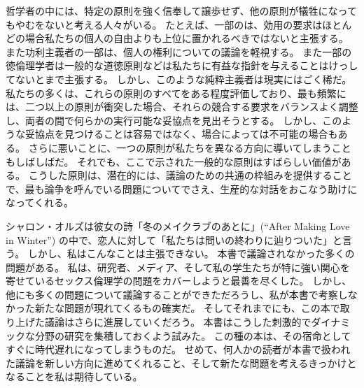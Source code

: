 \documentclass[paper=a4,book,openany]{jlreq}
\begin{document}
\vspace{1\zw}

哲学者の中には、特定の原則を強く信奉して譲歩せず、他の原則が犠牲になってもやむをないと考える人々がいる。
たとえば、一部のは、効用の要求はほとんどの場合私たちの個人の自由よりも上位に置かれるべきではないと主張する。
また功利主義者の一部は、個人の権利についての議論を軽視する。
また一部の徳倫理学者は一般的な道徳原則などは私たちに有益な指針を与えることはけっしてないとまで主張する。
しかし、このような純粋主義者は現実にはごく稀だ。
私たちの多くは、これらの原則のすべてをある程度評価しており、最も頻繁には、二つ以上の原則が衝突した場合、それらの競合する要求をバランスよく調整し、両者の間で何らかの実行可能な妥協点を見出そうとする。
しかし、このような妥協点を見つけることは容易ではなく、場合によっては不可能の場合もある。
さらに悪いことに、一つの原則が私たちを異なる方向に導いてしまうこともしばしばだ。
それでも、ここで示された一般的な原則はすばらしい価値がある。
こうした原則は、潜在的には、議論のための共通の枠組みを提供することで、最も論争を呼んでいる問題についてでさえ、生産的な対話をおこなう助けになってくれる。

\vspace{1\zw}

シャロン・オルズは彼女の詩「冬のメイクラブのあとに」(``After Making Love in Winter'') の中で、恋人に対して「私たちは問いの終わりに辿りついた」と言う。
しかし、私はこんなことは主張できない。
本書で議論されなかった多くの問題がある。
私は、研究者、メディア、そして私の学生たちが特に強い関心を寄せているセックス倫理学の問題をカバーしようと最善を尽くした。
しかし、他にも多くの問題について議論することができただろうし、私が本書で考察しなかった新たな問題が現れてくるもの確実だ。
そしてそれまでにも、この本で取り上げた議論はさらに進展していくだろう。
本書はこうした刺激的でダイナミックな分野の研究を集積しておくよう試みた。
この種の本は、その宿命としてすぐに時代遅れになってしまうものだ。
せめて、何人かの読者が本書で扱われた議論を新しい方向に進めてくれること、そして新たな問題を考えるきっかけとなることを私は期待している。

\end{document}
